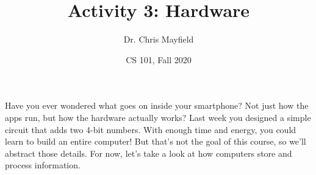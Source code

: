 \documentclass[12pt]{article}
\title{Activity 3: Hardware}
\author{Dr. Chris Mayfield}
\date{CS 101, Fall 2020}
\begin{document}
\maketitle

Have you ever wondered what goes on inside your smartphone?
Not just how the apps run, but how the hardware actually works?
Last week you designed a simple circuit that adds two 4-bit numbers.
With enough time and energy, you could learn to build an entire computer!
But that's not the goal of this course, so we'll abstract those details.
For now, let's take a look at how computers store and process information.



\end{document}
